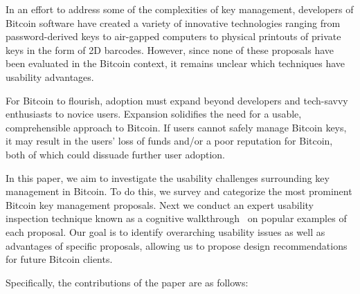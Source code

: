 In an effort to address some of the complexities of key management, developers of Bitcoin software have created a variety of innovative technologies ranging from password-derived keys to air-gapped computers to physical printouts of private keys in the form of 2D barcodes. However, since none of these proposals have been evaluated in the Bitcoin context, it remains unclear which techniques have usability advantages.

For Bitcoin to flourish, adoption must expand beyond developers and tech-savvy enthusiasts to novice users. Expansion solidifies the need for a usable, comprehensible approach to Bitcoin. If users cannot safely manage Bitcoin keys, it may result in the users' loss of funds and/or a poor reputation for Bitcoin, both of which could dissuade further user adoption. 

In this paper, we aim to investigate the usability challenges surrounding key management in Bitcoin. To do this, we survey and categorize the most prominent Bitcoin key management proposals. Next we conduct an expert usability inspection technique known as a cognitive walkthrough~\cite{WRLP94} on popular examples of each proposal. Our goal is to identify overarching usability issues as well as advantages of specific proposals, allowing us to propose design recommendations for future Bitcoin clients.



Specifically, the contributions of the paper are as follows:

